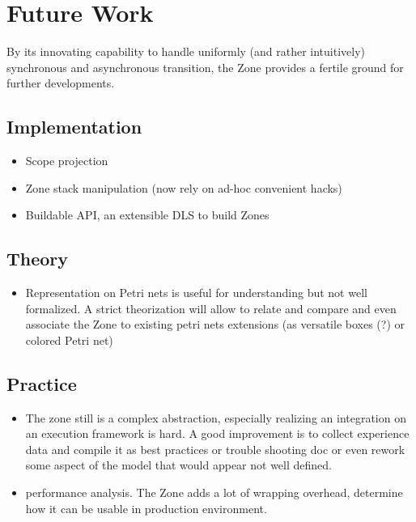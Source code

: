 
\chapter{Future Work}

By its innovating capability to handle uniformly (and rather intuitively) synchronous and asynchronous transition, the Zone provides a fertile ground for further developments.

\section{Implementation}

\begin{itemize}
\item Scope projection
\item Zone stack manipulation (now rely on ad-hoc convenient hacks)
\item Buildable API, an extensible DLS to build Zones
\end{itemize}

\section{Theory}

\begin{itemize}
\item Representation on Petri nets is useful for understanding but not well formalized. A strict theorization will allow to relate and compare and even associate the Zone to existing petri nets extensions (as versatile boxes (?) or colored Petri net)
\end{itemize}

\section{Practice}

\begin{itemize}
\item The zone still is a complex abstraction, especially realizing an integration on an execution framework is hard. A good improvement is to collect experience data and compile it as best practices or trouble shooting doc or even rework some aspect of the model that would appear not well defined.
\item performance analysis. The Zone adds a lot of wrapping overhead, determine how it can be usable in production environment.
\end{itemize}
